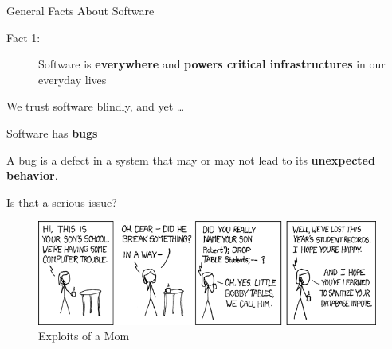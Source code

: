 \documentclass[aspectratio=169]{beamer}
\begin{document}
  \begin{frame}{General Facts About Software}
    \pause
    \begin{description}
      \item[Fact 1:] Software is \textbf{everywhere} and \textbf{powers critical infrastructures} in our everyday lives\\
    \end{description}
    \pause
    \begin{center}
    We trust software blindly, and yet \ldots
    \end{center}
    \vspace{-1.3em}
    \pause
    \begin{description}
      \vfill  
      \item[Fact 2:] Software has \textbf{bugs}
    \end{description}
    \pause
    \vfill
    \begin{definition}
      \vspace{0.3em}
      A \textcolor{mLightGreen}{bug} is a defect in a system that may or may not lead to its \textbf{unexpected behavior}.
    \end{definition}
    \vfill
  \end{frame}

  \begin{frame}{Is that a serious issue?}
    \vspace{0.5em}
    \begin{figure}
      \includegraphics[scale=0.6]{figures/exploits_of_a_mom}
      \caption{Exploits of a Mom}
    \end{figure}
  \end{frame}
  
\end{document}
